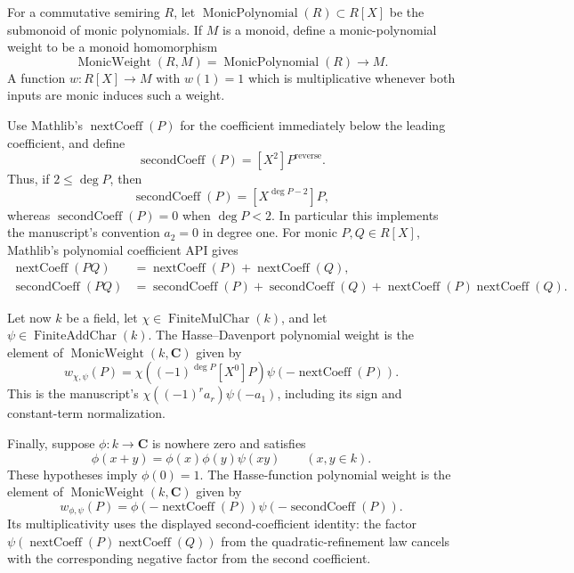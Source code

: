\begin{definition}\label{mod:finitefield-polynomialweights}
For a commutative semiring $R$, let
$\operatorname{MonicPolynomial}(R)\subset R[X]$ be the submonoid of monic
polynomials.  If $M$ is a monoid, define a monic-polynomial weight to be a
monoid homomorphism
\[
 \operatorname{MonicWeight}(R,M)
   =\operatorname{MonicPolynomial}(R)\longrightarrow M.
\]
A function $w:R[X]\to M$ with $w(1)=1$ which is multiplicative whenever
both inputs are monic induces such a weight.

Use Mathlib's $\operatorname{nextCoeff}(P)$ for the coefficient immediately
below the leading coefficient, and define
\[
 \operatorname{secondCoeff}(P)=[X^2]P^{\mathrm{reverse}}.
\]
Thus, if $2\leq\deg P$, then
\[
 \operatorname{secondCoeff}(P)
   =[X^{\deg P-2}]P,
\]
whereas $\operatorname{secondCoeff}(P)=0$ when $\deg P<2$.  In particular
this implements the manuscript's convention $a_2=0$ in degree one.
For monic $P,Q\in R[X]$, Mathlib's polynomial coefficient API gives
\[
 \begin{aligned}
  \operatorname{nextCoeff}(PQ)
    &=\operatorname{nextCoeff}(P)+\operatorname{nextCoeff}(Q),\\
  \operatorname{secondCoeff}(PQ)
    &=\operatorname{secondCoeff}(P)+\operatorname{secondCoeff}(Q)
      +\operatorname{nextCoeff}(P)\operatorname{nextCoeff}(Q).
 \end{aligned}
\]

Let now $k$ be a field, let
$\chi\in\operatorname{FiniteMulChar}(k)$, and let
$\psi\in\operatorname{FiniteAddChar}(k)$.  The Hasse--Davenport polynomial
weight is the element of $\operatorname{MonicWeight}(k,\mathbf C)$ given by
\[
 w_{\chi,\psi}(P)
 =\chi\!\left((-1)^{\deg P}[X^0]P\right)
    \psi\!\left(-\operatorname{nextCoeff}(P)\right).
\]
This is the manuscript's
$\chi((-1)^r a_r)\psi(-a_1)$, including its sign and constant-term
normalization.

Finally, suppose $\phi:k\to\mathbf C$ is nowhere zero and satisfies
\[
 \phi(x+y)=\phi(x)\phi(y)\psi(xy)
 \qquad(x,y\in k).
\]
These hypotheses imply $\phi(0)=1$.  The Hasse-function polynomial weight
is the element of $\operatorname{MonicWeight}(k,\mathbf C)$ given by
\[
 w_{\phi,\psi}(P)
 =\phi\!\left(-\operatorname{nextCoeff}(P)\right)
    \psi\!\left(-\operatorname{secondCoeff}(P)\right).
\]
Its multiplicativity uses the displayed second-coefficient identity: the
factor $\psi(\operatorname{nextCoeff}(P)\operatorname{nextCoeff}(Q))$
from the quadratic-refinement law cancels with the corresponding negative
factor from the second coefficient.
\leanok
{}
\FormalizationContract
\end{definition}

